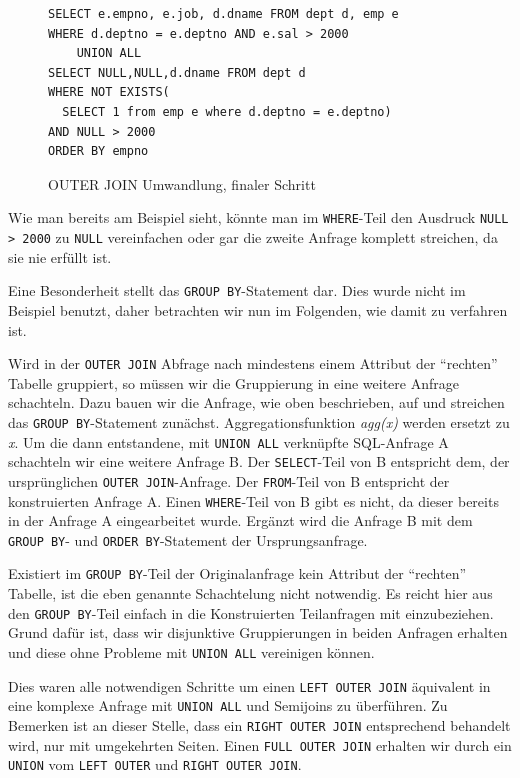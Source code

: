 \begin{figure}[h]
\begin{verbatim}
SELECT e.empno, e.job, d.dname FROM dept d, emp e
WHERE d.deptno = e.deptno AND e.sal > 2000
    UNION ALL
SELECT NULL,NULL,d.dname FROM dept d 
WHERE NOT EXISTS(
  SELECT 1 from emp e where d.deptno = e.deptno)
AND NULL > 2000
ORDER BY empno
\end{verbatim}
\caption{OUTER JOIN Umwandlung, finaler Schritt}
\end{figure}

Wie man bereits am Beispiel sieht, könnte man im \verb|WHERE|-Teil den Ausdruck \verb|NULL > 2000| zu \verb|NULL| vereinfachen oder gar die zweite Anfrage komplett streichen, da sie nie erfüllt ist. 

Eine Besonderheit stellt das \verb|GROUP BY|-Statement dar. Dies wurde nicht im Beispiel benutzt, daher betrachten wir nun im Folgenden, wie damit zu verfahren ist.

Wird in der \verb|OUTER JOIN| Abfrage nach mindestens einem Attribut der ``rechten'' Tabelle gruppiert, so müssen wir die Gruppierung in eine weitere Anfrage schachteln. Dazu bauen wir die Anfrage, wie oben beschrieben, auf und streichen das \verb|GROUP BY|-Statement zunächst. Aggregationsfunktion \textit{agg(x)} werden ersetzt zu \textit{x}. Um die dann entstandene, mit \verb|UNION ALL| verknüpfte SQL-Anfrage A schachteln wir eine weitere Anfrage B. Der \verb|SELECT|-Teil von B entspricht dem, der ursprünglichen \verb|OUTER JOIN|-Anfrage. Der \verb|FROM|-Teil von B entspricht der konstruierten Anfrage A. Einen \verb|WHERE|-Teil von B gibt es nicht, da dieser bereits in der Anfrage A eingearbeitet wurde. Ergänzt wird die Anfrage B mit dem \verb|GROUP BY|- und \verb|ORDER BY|-Statement der Ursprungsanfrage.

Existiert im \verb|GROUP BY|-Teil der Originalanfrage kein Attribut der ``rechten'' Tabelle, ist die eben genannte Schachtelung nicht notwendig. Es reicht hier aus den \verb|GROUP BY|-Teil einfach in die Konstruierten Teilanfragen mit einzubeziehen. Grund dafür ist, dass wir disjunktive Gruppierungen in beiden Anfragen erhalten und diese ohne Probleme mit \verb|UNION ALL| vereinigen können.

Dies waren alle notwendigen Schritte um einen \verb|LEFT OUTER JOIN| äquivalent in eine komplexe Anfrage mit \verb|UNION ALL| und Semijoins zu überführen. Zu Bemerken ist an dieser Stelle, dass ein \verb|RIGHT OUTER JOIN| entsprechend behandelt wird, nur mit umgekehrten Seiten. Einen \verb|FULL OUTER JOIN| erhalten wir durch ein \verb|UNION| vom \verb|LEFT OUTER| und \verb|RIGHT OUTER JOIN|. 

